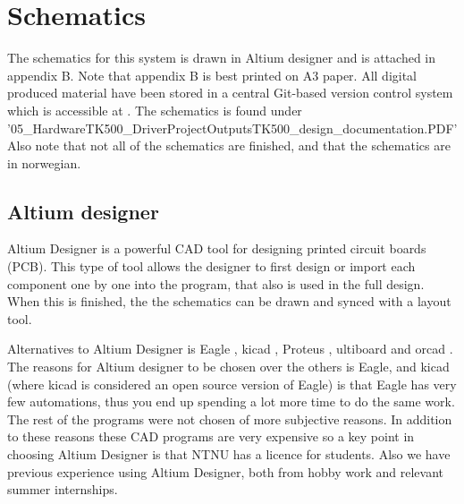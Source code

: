 \section{Schematics}
The schematics for this system is drawn in Altium designer and is attached in appendix B. Note that appendix B is best printed on A3 paper. All digital produced material have been stored in a central Git-based version control system which is accessible at \citep{githubtesla}. The schematics is found under '05\_Hardware\/TK500\_Driver\/ProjectOutputs\/TK500\_design\_documentation.PDF' Also note that not all of the schematics are finished, and that the schematics are in norwegian.

\subsection{Altium designer}
\label{altium}
Altium Designer \citep{altium} is a powerful CAD tool for designing printed circuit boards (PCB). This type of tool allows the designer to first design or import each component one by one into the program, that also is used in the full design. When this is finished, the the schematics can be drawn and synced with a layout tool.

Alternatives to Altium Designer is Eagle \citep{eagle}, kicad \citep{kicad}, Proteus \citep{proteus}, ultiboard \citep{ultiboard} and orcad \citep{orcad}. The reasons for Altium designer to be chosen over the others is Eagle, and kicad (where  kicad is considered an open source version of Eagle) is that Eagle has very few automations, thus you end up spending a lot more time to do the same work. The rest of the programs were not chosen of more subjective reasons. In addition to these reasons these CAD programs are very expensive so a key point in choosing Altium Designer is that NTNU has a licence for students. Also we have previous experience using Altium Designer, both from hobby work and relevant summer internships.